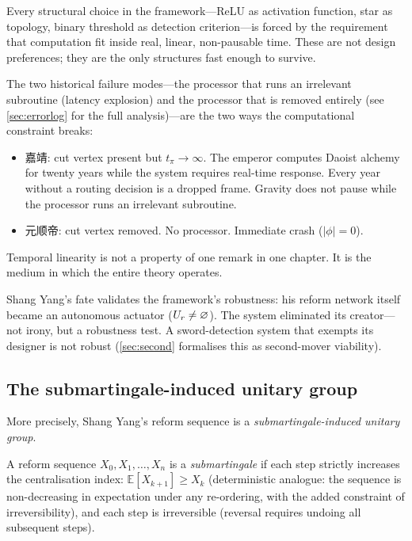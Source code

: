 \begin{remark}
Every structural choice in the framework---ReLU as activation
function, star as topology, binary threshold as detection
criterion---is forced by the requirement that computation fit inside
real, linear, non-pausable time.  These are not design preferences;
they are the only structures fast enough to survive.

The two historical failure modes---the processor that runs an
irrelevant subroutine (latency explosion) and the processor that is
removed entirely (see \cref{sec:errorlog} for the full
analysis)---are the two ways the computational constraint breaks:
\begin{itemize}
\item 嘉靖: cut vertex present but $t_\pi \to \infty$.
  The emperor computes Daoist alchemy for twenty years while the
  system requires real-time response.  Every year without a routing
  decision is a dropped frame.  Gravity does not pause while the
  processor runs an irrelevant subroutine.
\item 元顺帝: cut vertex removed.  No processor.  Immediate crash
  ($|\phi| = 0$).
\end{itemize}
Temporal linearity is not a property of one remark in one chapter.
It is the medium in which the entire theory operates.
\end{remark}

Shang Yang's fate validates the framework's robustness: his reform
network itself became an autonomous actuator ($U_r \neq \varnothing$).
The system eliminated its creator---not irony, but a robustness test.
A sword-detection system that exempts its designer is not robust
(\cref{sec:second} formalises this as second-mover viability).

\subsection{The submartingale-induced unitary group}

More precisely, Shang Yang's reform sequence is a
\emph{submartingale-induced unitary group}.

\begin{definition}\label{def:submartingale}
A reform sequence $X_0, X_1, \ldots, X_n$ is a \emph{submartingale}
if each step strictly increases the centralisation index:
$\mathbb{E}[X_{k+1}] \geq X_k$ (deterministic analogue: the
sequence is non-decreasing in expectation under any re-ordering,
with the added constraint of irreversibility), and each step is
irreversible (reversal requires undoing all subsequent steps).
\end{definition}

